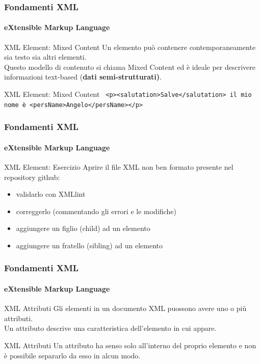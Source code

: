 \begin{frame}
    \frametitle{Fondamenti XML}
    \framesubtitle{eXtensible Markup Language}
    \addtocounter{nframe}{1}

	\begin{block}{XML Element: Mixed Content}
		Un elemento può contenere contemporaneamente sia testo sia altri elementi. 
		\\Questo modello di contenuto si chiama Mixed Content ed è ideale per descrivere informazioni text-based (\textbf{dati semi-strutturati)}.
	\end{block}

	\begin{block}{XML Element: Mixed Content}
		\texttt{
			<p><salutation>Salve</salutation> il mio nome è <persName>Angelo</persName></p>
			} 
	\end{block}


\end{frame}

\begin{frame}
    \frametitle{Fondamenti XML}
    \framesubtitle{eXtensible Markup Language}
    \addtocounter{nframe}{1}

	\begin{block}{XML Element: Esercizio}
		Aprire il file XML non ben formato presente nel repository github:
		\begin{itemize}
			\item validarlo con XMLlint
			\item correggerlo (commentando gli errori e le modifiche)
			\item aggiungere un figlio (child) ad un elemento
			\item aggiungere un fratello (sibling) ad un elemento
		\end{itemize}
	\end{block}

\end{frame}


\begin{frame}
    \frametitle{Fondamenti XML}
    \framesubtitle{eXtensible Markup Language}
    \addtocounter{nframe}{1}

	\begin{block}{XML Attributi}
		Gli elementi in un documento XML puossono avere uno o più attributi.
		\\ Un attributo descrive una caratteristica dell'elemento in cui appare.
	\end{block}

	\begin{block}{XML Attributi}
		Un attributo ha senso solo all'interno del proprio elemento e non è possibile separarlo da esso in alcun modo.
	\end{block}

\end{frame}


